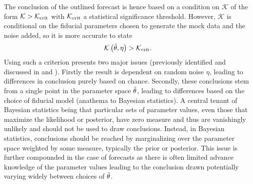 \documentclass[twocolumn,english,aps,prd,amsmath,amssymb,reprint,floatfix,nofootinbib,showkeys]{revtex4-2}
\newcommand{\br}{\mathcal{K}}
\newif\ifhighlightchanges
\newcommand{\change}[1]{{\ifhighlightchanges\color{red} #1\else #1\fi}}
\begin{document}
The conclusion of the outlined forecast is hence based on a condition on $\br$ of the form $\br > \br_{\rm crit}$ with $\br_{\rm crit}$ a statistical significance threshold. 
However, $\br$ is conditional on the fiducial parameters chosen to generate the mock data and the noise added, so it is more accurate to state
\begin{equation}~\label{eqn:partially_bayesian_forecast}
    \br\left(\Tilde{\theta}, \eta\right) > \br_{\rm crit}.
\end{equation}
Using such a criterion presents two major issues \change{(previously identified and discussed in \citet{Mukherjee_2006} and \citet{Trotta_2007b})}. 
Firstly the result is dependent on random noise $\eta$, leading to differences in conclusion purely based on chance.
Secondly, these conclusions stem from a single point in the parameter space $\Tilde{\theta}$, leading to differences based on the choice of fiducial model (anathema to Bayesian statistics).
A central tenant of Bayesian statistics being that particular sets of parameter values, even those that maximize the likelihood or posterior, have zero measure and thus are vanishingly unlikely and should not be used to draw conclusions.
Instead, in Bayesian statistics, conclusions should be reached by marginalizing over the parameter space weighted by some measure, typically the prior or posterior. 
This issue is further compounded in the case of forecasts as there is often limited advance knowledge of the parameter values leading to the conclusion drawn potentially varying widely between choices of $\Tilde{\theta}$.
\end{document}
